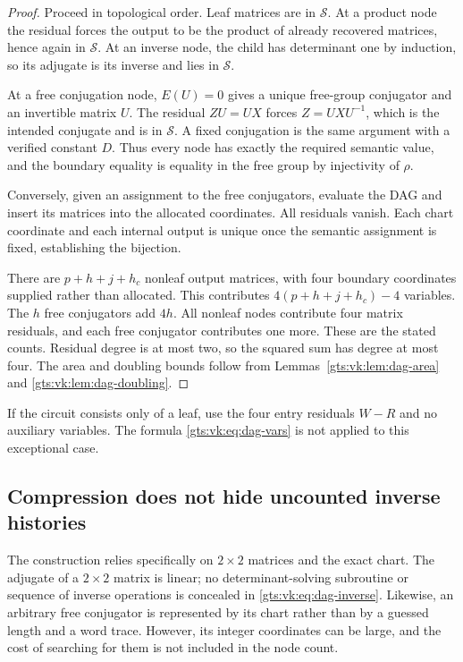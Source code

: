 \documentclass[11pt,letterpaper]{article}
\theoremstyle{definition}
\theoremstyle{remark}
\newcommand{\San}{\mathcal S}
\begin{document}
\begin{proof}
Proceed in topological order. Leaf matrices are in $\San$. At a product node the residual forces the output to be the product of already recovered matrices, hence again in $\San$. At an inverse node, the child has determinant one by induction, so its adjugate is its inverse and lies in $\San$.

At a free conjugation node, $E(U)=0$ gives a unique free-group conjugator and an invertible matrix $U$. The residual $ZU=UX$ forces $Z=UXU^{-1}$, which is the intended conjugate and is in $\San$. A fixed conjugation is the same argument with a verified constant $D$. Thus every node has exactly the required semantic value, and the boundary equality is equality in the free group by injectivity of $\rho$.

Conversely, given an assignment to the free conjugators, evaluate the DAG and insert its matrices into the allocated coordinates. All residuals vanish. Each chart coordinate and each internal output is unique once the semantic assignment is fixed, establishing the bijection.

There are $p+h+j+h_c$ nonleaf output matrices, with four boundary coordinates supplied rather than allocated. This contributes $4(p+h+j+h_c)-4$ variables. The $h$ free conjugators add $4h$. All nonleaf nodes contribute four matrix residuals, and each free conjugator contributes one more. These are the stated counts. Residual degree is at most two, so the squared sum has degree at most four. The area and doubling bounds follow from Lemmas~\ref{gts:vk:lem:dag-area} and \ref{gts:vk:lem:dag-doubling}.
\end{proof}

If the circuit consists only of a leaf, use the four entry residuals $W-R$ and no auxiliary variables. The formula \eqref{gts:vk:eq:dag-vars} is not applied to this exceptional case.

\subsection{Compression does not hide uncounted inverse histories}

The construction relies specifically on $2\times2$ matrices and the exact chart. The adjugate of a $2\times2$ matrix is linear; no determinant-solving subroutine or sequence of inverse operations is concealed in \eqref{gts:vk:eq:dag-inverse}. Likewise, an arbitrary free conjugator is represented by its chart rather than by a guessed length and a word trace. However, its integer coordinates can be large, and the cost of searching for them is not included in the node count.
\end{document}
